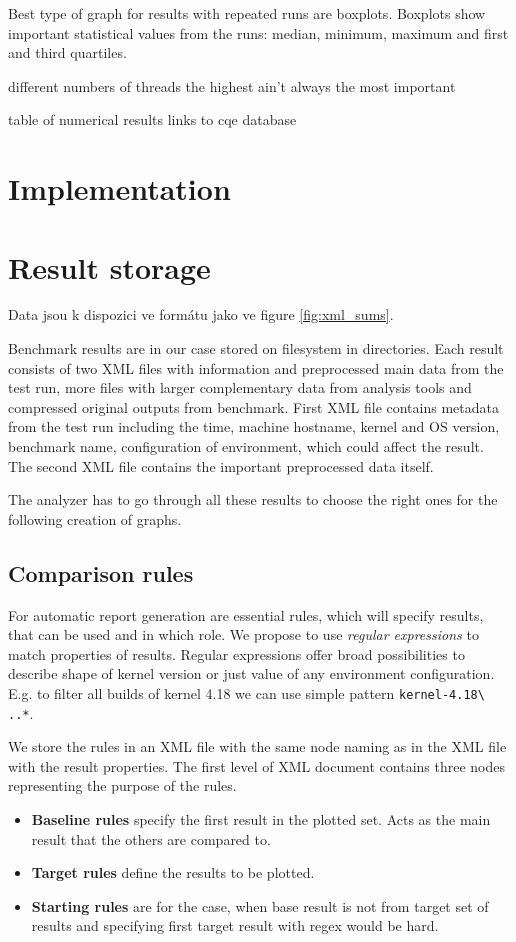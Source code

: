 Best type of graph for results with repeated runs are boxplots. Boxplots show
important statistical values from the runs: median, minimum, maximum and first
and third quartiles. 

different numbers of threads
the highest ain't always the most important

table of numerical results
links to cqe database

\section{Implementation}

\section{Result storage}
Data jsou k dispozici ve formátu jako ve figure \ref{fig:xml_sums}.

Benchmark results are in our case stored on filesystem in directories. Each result consists
of two XML files with information and preprocessed main data from the test run,
more files with larger complementary data from analysis tools and compressed
original outputs from benchmark. First XML file contains metadata from the test
run including the time, machine hostname, kernel and OS version, benchmark name,
configuration of environment, which could affect the result.
The second XML file contains the important preprocessed data itself.

The analyzer has to go through all these results to choose the right ones for the
following creation of graphs.

\subsection{Comparison rules}
For automatic report generation are essential rules, which will specify results,
that can be used and in which role. We propose to use \emph{regular expressions} to match
properties of results. Regular expressions offer broad possibilities to describe
shape of kernel version or just value of any environment configuration. E.g. to filter
all builds of kernel 4.18 we can use simple pattern \texttt{kernel-4.18\textbackslash
..*}.

We store the rules in an XML file with the same node naming as in the XML file
with the result properties. The first level of XML document contains three nodes
representing the purpose of the rules.
\begin{itemize}
  \item \textbf{Baseline rules} specify the first result in the plotted set.
    Acts as the main result that the others are compared to.
  \item \textbf{Target rules} define the results to be plotted.
  \item \textbf{Starting rules} are for the case, when base result is not from
    target set of results and specifying first target result with regex would be
    hard.
\end{itemize}

